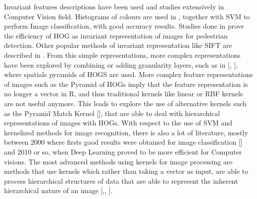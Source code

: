 Invariant features descriptions have been used and studies extensively in Computer Vision field. Histograms of colours are used in \cite{SVM_VC}, together with SVM to perform Image classification, with good accuracy results. Studies done in \cite{dalal2005histograms} prove the efficiency of HOG as invariant representation of images for pedestrian detection. Other popular methods of invariant representation like SIFT are described in \cite{DavidG}.  From this simple representations, more complex representations have been explored by combining or adding granularity layers, such as in [\cite{Spatial_Pyramid}, \cite{grauman2007pyramid}], where spatials pyramids of HOGS are used. More complex feature representations of images such as the Pyramid of HOGs imply that the feature representation is no longer a vector in R, and thus traditional kernels like linear or RBF kernels are not useful anymore. This leads to explore the use of alternative kernels such as the Pyramid Match Kernel [\cite{grauman2007pyramid}], that are able to deal with hierarchical representations of images with HOGs.
With respect to the use of SVM and kernelized methods for image recognition, there is also a lot of literature, mostly between 2000 where firsts good results were obtained for image classification [\cite{SVM_VC}] and 2010 or so, when Deep Learning proved to be more efficient for Computer visions. The most advanced methods using kernels for image processing are methods that use kernels which rather than taking a vector as input, are able to process hierarchical structures of data that are able to represent the inherent hierarchical nature of an image [\cite{Spatial_Pyramid},\cite{grauman2007pyramid}, \cite{bosch2007representing}]. 



